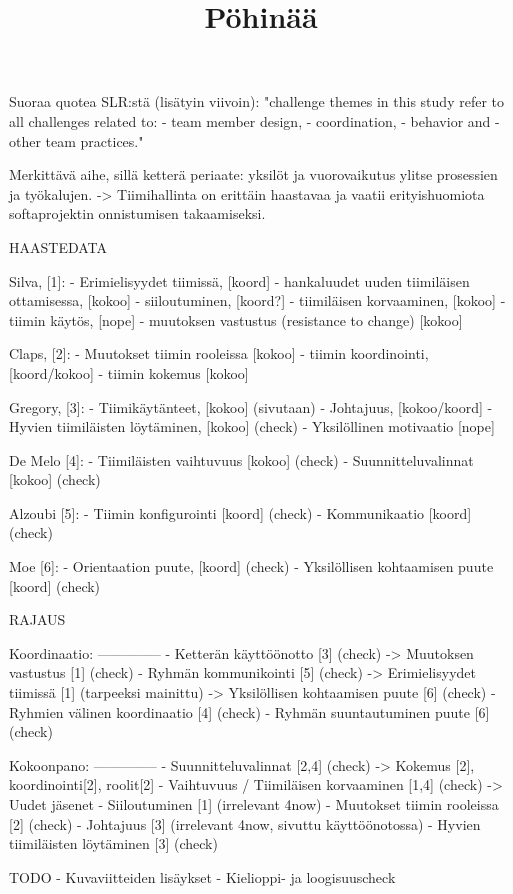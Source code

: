 \title{Pöhinää}

Suoraa quotea SLR:stä (lisätyin viivoin): 
"challenge themes in this study refer to all challenges related to:
- team member design, 
- coordination, 
- behavior and 
- other team practices."

Merkittävä aihe, sillä ketterä periaate: yksilöt ja vuorovaikutus ylitse prosessien ja työkalujen.
-> Tiimihallinta on erittäin haastavaa ja vaatii erityishuomiota softaprojektin onnistumisen takaamiseksi.

            HAASTEDATA

Silva,      [1]: 
- Erimielisyydet tiimissä,                      [koord]
- hankaluudet uuden tiimiläisen ottamisessa,    [kokoo]
- siiloutuminen,                                [koord?]
- tiimiläisen korvaaminen,                      [kokoo]
- tiimin käytös,                                [nope]
- muutoksen vastustus (resistance to change)    [kokoo]

Claps,      [2]:
- Muutokset tiimin rooleissa                    [kokoo]
- tiimin koordinointi,                          [koord/kokoo]
- tiimin kokemus                                [kokoo]

Gregory,    [3]:
- Tiimikäytänteet,                              [kokoo] (sivutaan)
- Johtajuus,                                    [kokoo/koord]
- Hyvien tiimiläisten löytäminen,               [kokoo] (check)
- Yksilöllinen motivaatio                       [nope]

De Melo     [4]:
- Tiimiläisten vaihtuvuus                       [kokoo] (check)
- Suunnitteluvalinnat                           [kokoo] (check)

Alzoubi     [5]:
- Tiimin konfigurointi                          [koord] (check)
- Kommunikaatio                                 [koord] (check)

Moe         [6]:
- Orientaation puute,                           [koord] (check)
- Yksilöllisen kohtaamisen puute                [koord] (check)

    RAJAUS

Koordinaatio:
--------------
- Ketterän käyttöönotto                     [3] (check)
    -> Muutoksen vastustus                  [1] (check)
- Ryhmän kommunikointi                      [5] (check)
    -> Erimielisyydet tiimissä              [1] (tarpeeksi mainittu)
    -> Yksilöllisen kohtaamisen puute       [6] (check)
- Ryhmien välinen koordinaatio              [4] (check)
- Ryhmän suuntautuminen puute               [6] (check)

Kokoonpano:
--------------
- Suunnitteluvalinnat                       [2,4] (check)
    -> Kokemus [2], koordinointi[2], roolit[2]
- Vaihtuvuus / Tiimiläisen korvaaminen      [1,4] (check)
    -> Uudet jäsenet
- Siiloutuminen                             [1] (irrelevant 4now)
- Muutokset tiimin rooleissa                [2] (check)
- Johtajuus                                 [3] (irrelevant 4now, sivuttu käyttöönotossa)
- Hyvien tiimiläisten löytäminen            [3] (check)

    TODO    
- Kuvaviitteiden lisäykset
- Kielioppi- ja loogisuuscheck
